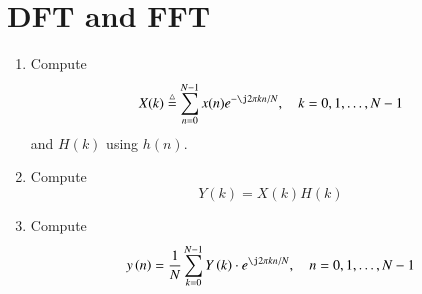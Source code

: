 \documentclass[journal,12pt,twocolumn]{IEEEtran}
\newcommand{\define}{\stackrel{\triangle}{=}}
\theoremstyle{remark}
\renewcommand\thesection{\arabic{section}}
\numberwithin{equation}{subsection}
\begin{document}
\section{DFT and FFT}
\begin{enumerate}[label=\thesection.\arabic*]
\item
Compute
\begin{equation}
X(k) \define \sum _{n=0}^{N-1}x(n) e^{-\j2\pi kn/N}, \quad k = 0,1,\dots, N-1
\end{equation}
and $H(k)$ using $h(n)$.
\item Compute 
\begin{equation}
Y(k) = X(k)H(k)
\label{eq:fp}
\end{equation}
\item Compute
\begin{equation}
y\brak{n}={\frac {1}{N}}\sum _{k=0}^{N-1}Y\brak{k}\cdot e^{\j 2\pi kn/N},\quad n = 0,1,\dots, N-1
\label{eq:I-FT}
\end{equation}


\end{enumerate}
\end{document}
